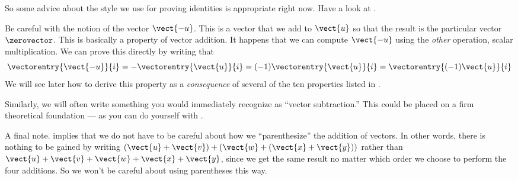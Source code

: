%
{So some advice about the style we use for proving identities is appropriate right now.}
{Have a look at .}
\par
%
Be careful with the notion of the vector $\vect{-u}$.  This is a vector that we add to $\vect{u}$ so that the result is the particular vector $\zerovector$.  This is basically a property of vector addition.  It happens that we can compute $\vect{-u}$ using the {\em other} operation, scalar multiplication.  We can prove this directly by writing that
%
\begin{equation*}
\vectorentry{\vect{-u}}{i}
=-\vectorentry{\vect{u}}{i}
=(-1)\vectorentry{\vect{u}}{i}
=\vectorentry{(-1)\vect{u}}{i}
\end{equation*}
%
We will see later how to derive this property as a {\em consequence} of several of the ten properties listed in .\par
%
Similarly, we will often write something you would immediately recognize as ``vector subtraction.''  This could be placed on a firm theoretical foundation --- as you can do yourself with .\par
%
A final note.   implies that we do not have to be careful about how we ``parenthesize'' the addition of vectors.  In other words, there is nothing to be gained by writing
$\left(\vect{u}+\vect{v}\right)+\left(\vect{w}+\left(\vect{x}+\vect{y}\right)\right)$
rather than
$\vect{u}+\vect{v}+\vect{w}+\vect{x}+\vect{y}$, since we get the same result no matter which order we choose to perform the four additions.  So we won't be careful about using parentheses this way.
%
%

